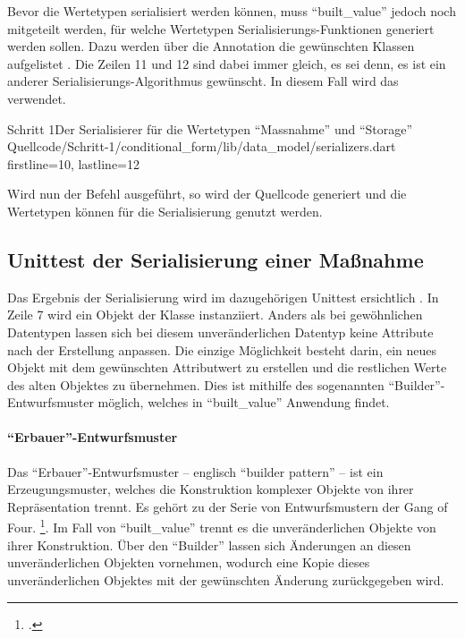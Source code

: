 \clearpage
Bevor die Wertetypen serialisiert werden können, muss \enquote{built_value} jedoch noch mitgeteilt werden, für welche Wertetypen Serialisierungs-Funktionen generiert werden sollen.
Dazu werden über die Annotation  die gewünschten Klassen aufgelistet .
Die Zeilen 11 und 12 sind dabei immer gleich, es sei denn, es ist ein anderer Serialisierungs-Algorithmus gewünscht.
In diesem Fall wird das  verwendet.

\begin{alexlisting}{Schritt 1}{Der Serialisierer für die Wertetypen \enquote{Massnahme} und \enquote{Storage}}
  {Quellcode/Schritt-1/conditional_form/lib/data_model/serializers.dart}
  {firstline=10, lastline=12}
  \label{lst:Schritt1Serialisierer}
\end{alexlisting}

Wird nun der Befehl   ausgeführt, so wird der Quellcode generiert und die Wertetypen können für die Serialisierung genutzt werden.

\subsection{Unittest der Serialisierung einer Maßnahme}

Das Ergebnis der Serialisierung wird im dazugehörigen Unittest ersichtlich \Lst{\ref{lst:SerialisierungEinerMassnahmeUnittest}}.
In Zeile 7 wird ein Objekt der Klasse  instanziiert.
Anders als bei gewöhnlichen Datentypen lassen sich bei diesem unveränderlichen Datentyp keine Attribute nach der Erstellung anpassen.
Die einzige Möglichkeit besteht darin, ein neues Objekt  mit dem gewünschten Attributwert zu erstellen und die restlichen Werte des alten Objektes zu übernehmen.
Dies ist mithilfe des sogenannten \enquote{Builder}-Entwurfsmuster möglich, welches in \enquote{built_value} Anwendung findet.

\paragraph{\enquote{Erbauer}-Entwurfsmuster} Das \enquote{Erbauer}-Entwurfsmuster -- englisch \enquote{builder pattern} -- ist ein Erzeugungsmuster, welches die Konstruktion komplexer Objekte von ihrer Repräsentation trennt.
Es gehört zu der Serie von Entwurfsmustern der Gang of Four. \footcite[Vgl.][S. 119]{gamma2009entwurfsmuster}.
Im Fall von \enquote{built_value} trennt es die unveränderlichen Objekte von ihrer Konstruktion.
Über den \enquote{Builder} lassen sich Änderungen an diesen unveränderlichen Objekten vornehmen, wodurch eine Kopie dieses unveränderlichen Objektes mit der gewünschten Änderung zurückgegeben wird.

